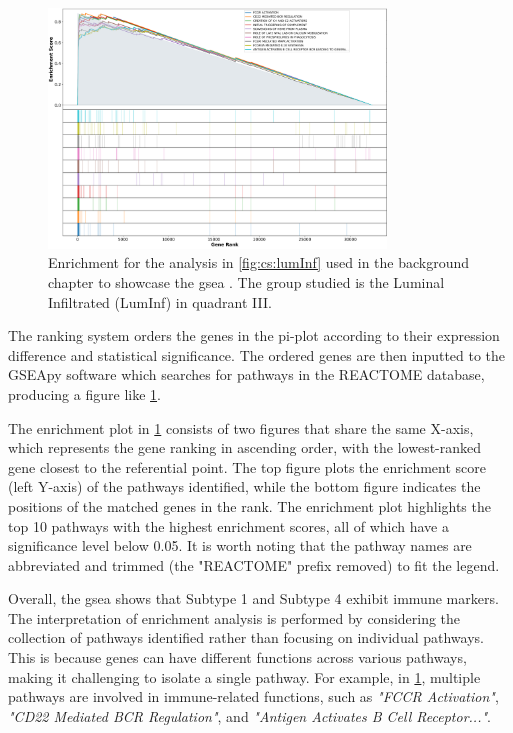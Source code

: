 \begin{figure}[!b]
    \centering
    \includegraphics[width=0.8\textwidth, keepaspectratio]{Sections/ClusteringAnalysis/Resources/discussion/other_groups/lumInf_reactome_10_top.png}
    \caption[GSEA plot example]{Enrichment for the analysis in \cref{fig:cs:lumInf} used in the background chapter to showcase the \acrshort{gsea} . The group studied is the Luminal Infiltrated (LumInf) in quadrant III.}
    \label{fig:lit:gsea_eg}
\end{figure}

The ranking system orders the genes in the pi-plot according to their expression difference and statistical significance. The ordered genes are then inputted to the GSEApy software which searches for pathways in the REACTOME database, producing a figure like \cref{fig:lit:gsea_eg}. 

The enrichment plot in \cref{fig:lit:gsea_eg} consists of two figures that share the same X-axis, which represents the gene ranking in ascending order, with the lowest-ranked gene closest to the referential point. The top figure plots the enrichment score (left Y-axis) of the pathways identified, while the bottom figure indicates the positions of the matched genes in the rank. The enrichment plot highlights the top 10 pathways with the highest enrichment scores, all of which have a significance level below 0.05. It is worth noting that the pathway names are abbreviated and trimmed (the "REACTOME" prefix removed) to fit the legend.

Overall, the \acrshort{gsea} shows that Subtype 1 and Subtype 4 exhibit immune markers. The interpretation of enrichment analysis is performed by considering the collection of pathways identified rather than focusing on individual pathways. This is because genes can have different functions across various pathways, making it challenging to isolate a single pathway. For example, in \cref{fig:lit:gsea_eg}, multiple pathways are involved in immune-related functions, such as \textit{"FCCR Activation"}, \textit{"CD22 Mediated BCR Regulation"}, and \textit{"Antigen Activates B Cell Receptor..."}. 


